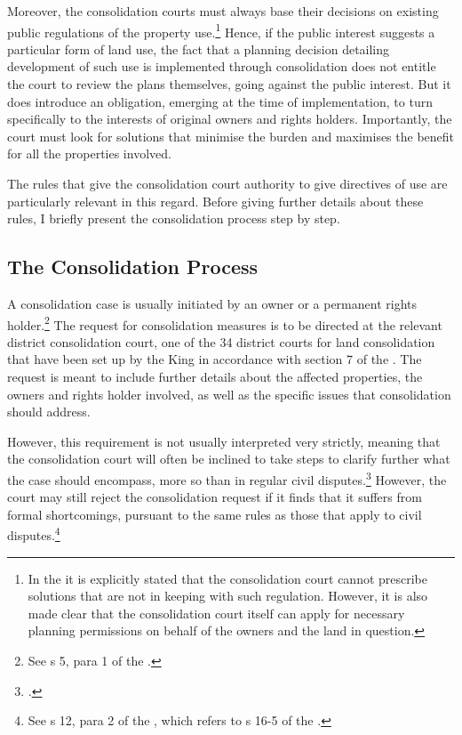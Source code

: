 Moreover, the consolidation courts must always base their decisions on existing public regulations of the property use.\footnote{In the \cite[3-17]{lca13} it is explicitly stated that the consolidation court cannot prescribe solutions that are not in keeping with such regulation. However, it is also made clear that the consolidation court itself can apply for necessary planning permissions on behalf of the owners and the land in question.}
Hence, if the public interest suggests a particular form of land use, the fact that a planning decision detailing development of such use is implemented through consolidation does not entitle the court to review the plans themselves, going against the public interest. But it does introduce an obligation, emerging at the time of implementation, to turn specifically to the interests of original owners and rights holders. Importantly, the court must look for solutions that minimise the burden and maximises the benefit for all the properties involved.

The rules that give the consolidation court authority to give directives of use are particularly relevant in this regard. Before giving further details about these rules, I briefly present the consolidation process step by step.

\subsection{The Consolidation Process}\label{subsec:lcp}

A consolidation case is usually initiated by an owner or a permanent rights holder.\footnote{See s 5, para 1 of the \cite{lca79}.} The request for consolidation measures is to be directed at the relevant district consolidation court, one of the 34 district courts for land consolidation that have been set up by the King in accordance with section 7 of the \cite{lca79}. The request is meant to include further details about the affected properties, the owners and rights holder involved, as well as the specific issues that consolidation should address.

However, this requirement is not usually interpreted very strictly, meaning that the consolidation court will often be inclined to take steps to clarify further what the case should encompass, more so than in regular civil disputes.\footcite[39]{langbach09} However, the court may still reject the consolidation request if it finds that it suffers from formal shortcomings, pursuant to the same rules as those that apply to civil disputes.\footnote{See s 12, para 2 of the \cite{lca79}, which refers to s 16-5 of the \cite{cda05}.}

